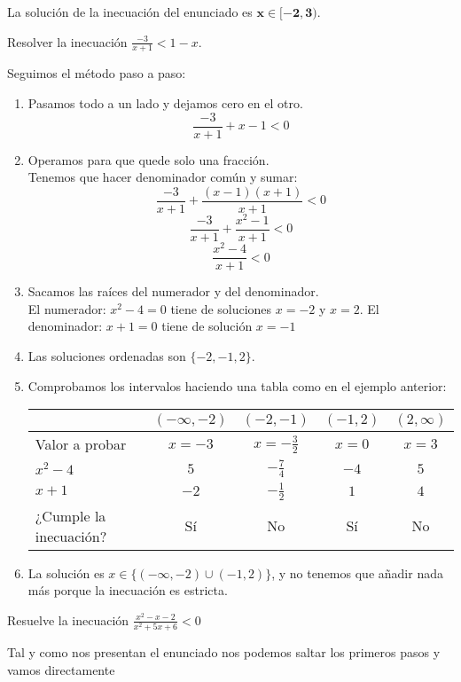 \documentclass[a4paper,11pt,answers]{exam}
\begin{document}
\begin{questions}
\begin{solution}
\begin{enumerate}
    \end{enumerate}
    La solución de la inecuación del enunciado es $\boldsymbol{x \in [-2,3)}$.
  \end{solution}
\question Resolver la inecuación $\frac{-3}{x+1} < 1-x$.
  \begin{solution}
    Seguimos el método paso a paso:
    \begin{enumerate}
    \item Pasamos todo a un lado y dejamos cero en el otro.
      \[\frac{-3}{x+1} + x - 1 < 0 \]
    \item Operamos para que quede solo una fracción.\\
      Tenemos que hacer denominador común y sumar:
      \[\frac{-3}{x+1} + \frac{(x-1)(x+1)}{x+1} < 0\]
      \[\frac{-3}{x+1} + \frac{x^2 - 1}{x+1} <0\]
      \[\frac{x^2 - 4}{x+1} < 0 \]
    \item Sacamos las raíces del numerador y del denominador.\\
      El numerador: $x^2 - 4 = 0$ tiene de soluciones $x = -2$ y $x= 2$.
      El denominador: $x + 1 = 0$ tiene de solución $x = -1$
    \item Las soluciones ordenadas son $\{-2, -1, 2\}$.
    \item Comprobamos los intervalos haciendo una tabla como en el ejemplo anterior:
      \begin{center}
        \def\arraystretch{1.5}
        \begin{tabular}{l|c|c|c|c|}
          &$(-\infty, -2)$&$(-2, -1)$&$(-1,2)$&$(2,\infty)$\\
          \hline
          Valor a probar&$x= -3$& $x = -\frac{3}{2}$&$x = 0$&$x = 3$\\
          \hline
          $x^2 - 4$&$5$&$-\frac{7}{4}$&$-4$&$5$\\
          \hline
          $x + 1$&$-2$&$-\frac{1}{2}$&$1$&$4$\\
          \hline
          ¿Cumple la inecuación?&Sí&No&Sí&No
        \end{tabular}
      \end{center}
    \item La solución es $x \in \{(-\infty, -2) \cup (-1,2)\}$, y no tenemos que añadir nada más porque
      la inecuación es estricta.
    \end{enumerate}
  \end{solution}
\question Resuelve la inecuación $\frac{x^2 - x - 2}{x^2 +5x + 6} < 0$
  \begin{solution}
    Tal y como nos presentan el enunciado nos podemos saltar los primeros pasos y vamos directamente

\end{solution}
\end{questions}
\end{document}
